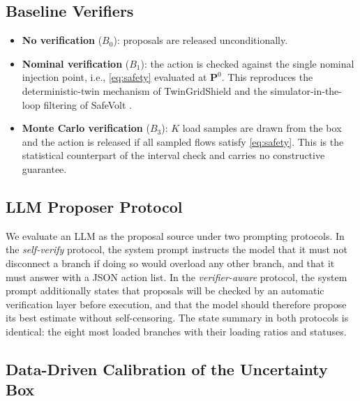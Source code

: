 \documentclass[journal]{IEEEtran}
\begin{document}
\subsection{Baseline Verifiers}
\label{sec:baselines}

\begin{itemize}
\item \textbf{No verification} ($B_0$): proposals are released unconditionally.
\item \textbf{Nominal verification} ($B_1$): the action is checked against the
single nominal injection point, i.e., \eqref{eq:safety} evaluated at
$\mathbf{P}^0$. This reproduces the deterministic-twin mechanism of
TwinGridShield \cite{twingridshield2026} and the simulator-in-the-loop filtering
of SafeVolt \cite{safevolt2026}.
\item \textbf{Monte Carlo verification} ($B_3$): $K$ load samples are drawn from
the box and the action is released if all sampled flows satisfy
\eqref{eq:safety}. This is the statistical counterpart of the interval check
and carries no constructive guarantee.
\end{itemize}

\subsection{LLM Proposer Protocol}
\label{sec:llm}

We evaluate an LLM as the proposal source under two prompting protocols.
In the \emph{self-verify} protocol, the system prompt instructs the model that
it must not disconnect a branch if doing so would overload any other branch, and
that it must answer with a JSON action list. In the \emph{verifier-aware}
protocol, the system prompt additionally states that proposals will be checked
by an automatic verification layer before execution, and that the model should
therefore propose its best estimate without self-censoring. The state summary in
both protocols is identical: the eight most loaded branches with their loading
ratios and statuses.

\subsection{Data-Driven Calibration of the Uncertainty Box}
\label{sec:calibration}
\end{document}
